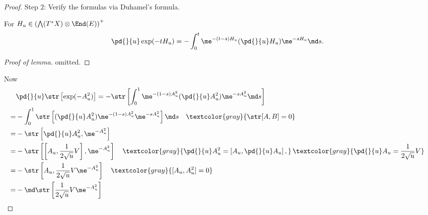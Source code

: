 \begin{proof}
    Step $2$: Verify the formulas via Duhamel's formula.
    \begin{lemma}
        For $H_u\in \left(\bigwedge(T^*X)\otimes\End(E)\right)^+$ 
        \begin{equation*}
            \pd{}{u}\exp(-tH_u) = 
            -\int_0^t\me^{-(t-s)H_u}(\pd{}{u}H_u)\me^{-sH_u}\md s.
        \end{equation*}
    \end{lemma}
    \begin{proof}[Proof of lemma]
        omitted.
    \end{proof}
    Now 
    \begin{align*}
        &\pd{}{u}\str\left[\exp(-A_u^2)\right] = 
        -\str\left[\int_{0}^{1}\me^{-(1-s)A_u^2}(\pd{}{u}A_u^2)
        \me^{-sA_u^2}\md s\right] \\
        =&-\int_{0}^{1}\str\left[(\pd{}{u}A_u^2)\me^{-(1-s)A_u^2}
        \me^{-sA_u^2}\right]\md s \quad\textcolor{gray}{\str[A,B]=0} \\
        =&-\str\left[\pd{}{u}A_u^2,\me^{-A_u^2}\right] \\
        =&-\str\left[\left[A_u,\frac{1}{2\sqrt{u}}V\right],
        \me^{-A_u^2}\right] \quad
        \textcolor{gray}{\pd{}{u}A_u^2=\left[A_u,\pd{}{u}A_u\right],}\,
        \textcolor{gray}{\pd{}{u}A_u = \frac{1}{2\sqrt{u}}V} \\
        =&-\str\left[A_u,\frac{1}{2\sqrt{u}}V\me^{-A_u^2}\right]\quad 
        \textcolor{gray}{[A_u,A_u^2]=0} \\
        =&-\md\str\left[\frac{1}{2\sqrt{u}}V\me^{-A_u^2}\right]
    \end{align*}
\end{proof}